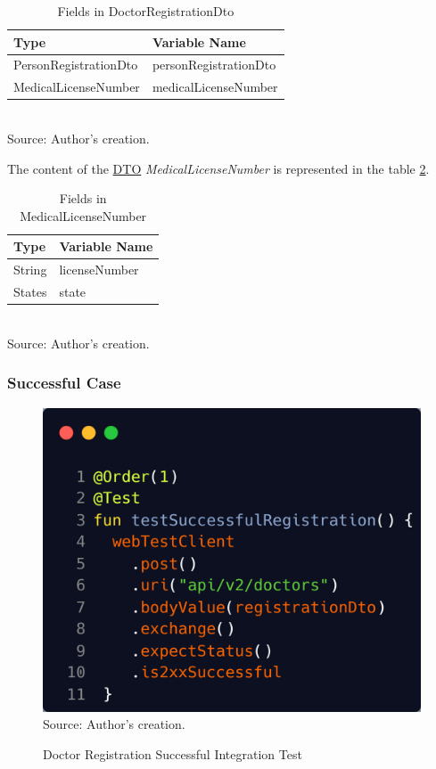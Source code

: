 \begin{table}[H]
	\centering
	\caption{Fields in DoctorRegistrationDto}
	\begin{tabular}{ll}
		\toprule
		\textbf{Type} & \textbf{Variable Name} \\
		\midrule
		PersonRegistrationDto & personRegistrationDto \\ \hline
		MedicalLicenseNumber & medicalLicenseNumber \\
		\bottomrule
	\end{tabular}
	\\ \footnotesize Source: Author's creation.
	\label{tab:doctor_registration_dto}
\end{table}

The content of the \hyperref[appendix:glossary]{DTO} \textit{MedicalLicenseNumber} is represented in the table \ref{tab:medical_license_number}.

\begin{table}[H]
	\centering
	\caption{Fields in MedicalLicenseNumber}
	\begin{tabular}{ll}
		\toprule
		\textbf{Type} & \textbf{Variable Name} \\
		\midrule
		String & licenseNumber \\ \hline
		States & state \\
		\bottomrule
	\end{tabular}
	\\ \footnotesize Source: Author's creation.
	\label{tab:medical_license_number}
\end{table}

\subsubsection{Successful Case}

\begin{figure}[H]
	\centering
	\caption{Doctor Registration Successful Integration Test}
	\includegraphics[width=1\linewidth]{figures/doctor_registration_integration_test_successful.png}
	\\ \footnotesize Source: Author's creation.
	\label{fig:doctor_registration_integration_test_successful}
\end{figure}

